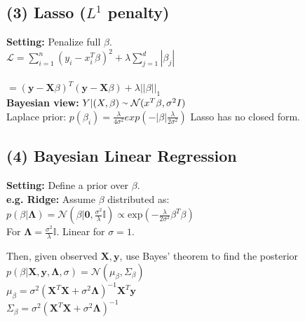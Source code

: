 \subsection*{(3) Lasso ($L^1$ penalty)}
\textbf{Setting:} Penalize full $\beta$.\\
$\mathcal{L} = \sum_{i=1}^n(y_i-x_i^T\beta)^2+\lambda\sum_{j=1}^d|\beta_j| $\\\\
$=(\mathbf{y}-\mathbf{X}\beta)^T(\mathbf{y}-\mathbf{X}\beta)+\lambda||\beta||_1$\\
\textbf{Bayesian view:} $Y|(X, \beta) \smallsim \mathcal{N}(x^T\beta, \sigma^2 I)$\\
Laplace prior: $p(\beta_i) = \frac{\lambda}{4\sigma^2} exp(-|\beta|\frac{\lambda}{2\sigma^2})$
Lasso has no closed form.

\subsection*{(4) Bayesian Linear Regression}
\textbf{Setting:} Define a prior over $\beta$.\\
\textbf{e.g. Ridge:} Assume $\beta$ distributed as:\\
$p(\beta|\bm{\bm{\Lambda}}){=}\mathcal{N}(\beta|\mathbf{0},\frac{\sigma^2}{\lambda}\mathbb{I}) {\propto} \mathrm{exp}(-\frac{\lambda}{2\sigma^2}\beta^T\beta)$\\
For $\bm{\Lambda}=\frac{\sigma^2}{\lambda}\mathbb{I}$. Linear for $\sigma=1$.

Then, given observed $\mathbf{X},\mathbf{y}$, use Bayes' theorem to find the posterior\\
$p(\beta|\mathbf{X},\mathbf{y}, \bm{\Lambda}, \sigma) = \mathcal{N}(\mu_{\beta}, \Sigma_{\beta})$\\
$\mu_\beta = \sigma^2(\mathbf{X}^T\mathbf{X} +\sigma^2\bm{\Lambda})^{-1}\mathbf{X}^T\mathbf{y}$\\
$\Sigma_\beta = \sigma^2(\mathbf{X}^T\mathbf{X} +\sigma^2\bm{\Lambda})^{-1}$

